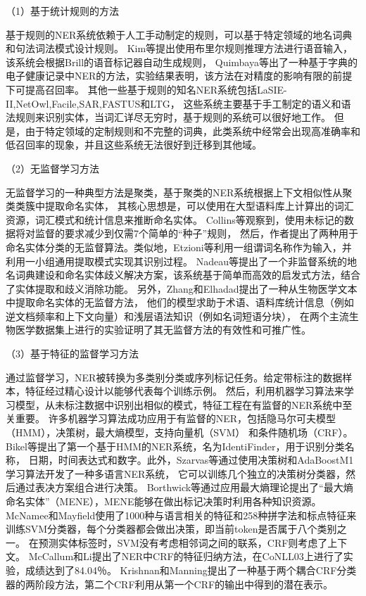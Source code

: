 （1）基于统计规则的方法

基于规则的NER系统依赖于人工手动制定的规则，可以基于特定领域的地名词典和句法词法模式设计规则。
Kim等提出使用布里尔规则推理方法进行语音输入，该系统会根据Brill的语音标记器自动生成规则\cite{kim2000rule}，
Quimbaya等出了一种基于字典的电子健康记录中NER的方法\cite{pomares2016named}，实验结果表明，该方法在对精度的影响有限的前提下可提高召回率。
其他一些基于规则的知名NER系统包括LaSIE-II,NetOwl,Facile,SAR,FASTUS和LTG，
这些系统主要基于手工制定的语义和语法规则来识别实体，当词汇详尽无穷时，基于规则的系统可以很好地工作。
但是，由于特定领域的定制规则和不完整的词典，此类系统中经常会出现高准确率和低召回率的现象，并且这些系统无法很好到迁移到其他域。

（2）无监督学习方法

无监督学习的一种典型方法是聚类，基于聚类的NER系统根据上下文相似性从聚类类簇中提取命名实体，
其核心思想是，可以使用在大型语料库上计算出的词汇资源，词汇模式和统计信息来推断命名实体。 
Collins等观察到，使用未标记的数据将对监督的要求减少到仅需7个简单的“种子”规则\cite{collins1999unsupervised}，
然后，作者提出了两种用于命名实体分类的无监督算法。类似地，Etzioni等利用一组谓词名称作为输入，并利用一小组通用提取模式实现其识别过程\cite{etzioni2005unsupervised}。 
Nadeau等提出了一个非监督系统的地名词典建设和命名实体歧义解决方案，该系统基于简单而高效的启发式方法，结合了实体提取和歧义消除功能\cite{nadeau2006unsupervised}。
另外，Zhang和Elhadad提出了一种从生物医学文本中提取命名实体的无监督方法\cite{zhang2013unsupervised}，
他们的模型求助于术语、语料库统计信息（例如逆文档频率和上下文向量）和浅层语法知识（例如名词短语分块），
在两个主流生物医学数据集上进行的实验证明了其无监督方法的有效性和可推广性。

（3）基于特征的监督学习方法

通过监督学习，NER被转换为多类别分类或序列标记任务。给定带标注的数据样本，特征经过精心设计以能够代表每个训练示例。
然后，利用机器学习算法来学习模型，从未标注数据中识别出相似的模式，特征工程在有监督的NER系统中至关重要。
许多机器学习算法成功应用于有监督的NER，包括隐马尔可夫模型（HMM），决策树，最大熵模型，支持向量机（SVM）
和条件随机场（CRF）。 Bikel等提出了第一个基于HMM的NER系统，名为IdentiFinder，用于识别分类名称，
日期，时间表达式和数字\cite{bikel1998nymble,bikel1999algorithm}。此外，Szarvas等通过使用决策树和AdaBoostM1学习算法开发了一种多语言NER系统，
它可以训练几个独立的决策树分类器，然后通过表决方案组合进行决策\cite{szarvas2006multilingual}。 
Borthwick等通过应用最大熵理论提出了“最大熵命名实体”（MENE），MENE能够在做出标记决策时利用各种知识资源。
 McNamee和Mayfield使用了1000种与语言相关的特征和258种拼字法和标点特征来训练SVM分类器，每个分类器都会做出决策，即当前token是否属于八个类别之一\cite{mcnamee2002entity}。
 在预测实体标签时，SVM没有考虑相邻词之间的联系，CRF则考虑了上下文。 
 McCallum和Li提出了NER中CRF的特征归纳方法，在CoNLL03上进行了实验，成绩达到了84.04％\cite{mccallum2003early}。 
 Krishnan和Manning提出了一种基于两个耦合CRF分类器的两阶段方法，第二个CRF利用从第一个CRF的输出中得到的潜在表示\cite{krishnan2006effective}。


